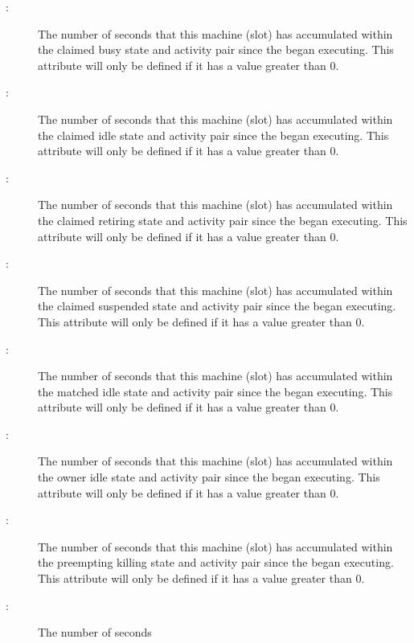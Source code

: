\begin{description}
\item[:] The number of seconds
that this machine (slot) has accumulated within the
claimed busy state and activity pair since the 
began executing.
This attribute will only be defined if it has a value greater than 0.
%
\item[:] The number of seconds
that this machine (slot) has accumulated within the
claimed idle state and activity pair since the 
began executing.
This attribute will only be defined if it has a value greater than 0.
%
\item[:] The number of seconds
that this machine (slot) has accumulated within the
claimed retiring state and activity pair since the 
began executing.
This attribute will only be defined if it has a value greater than 0.
%
\item[:] The number of seconds
that this machine (slot) has accumulated within the
claimed suspended state and activity pair since the 
began executing.
This attribute will only be defined if it has a value greater than 0.
%
\item[:] The number of seconds
that this machine (slot) has accumulated within the
matched idle state and activity pair since the 
began executing.
This attribute will only be defined if it has a value greater than 0.
%
\item[:] The number of seconds
that this machine (slot) has accumulated within the
owner idle state and activity pair since the 
began executing.
This attribute will only be defined if it has a value greater than 0.
%
\item[:] The number of seconds
that this machine (slot) has accumulated within the
preempting killing state and activity pair since the 
began executing.
This attribute will only be defined if it has a value greater than 0.
%
\item[:] The number of seconds

\end{description}
